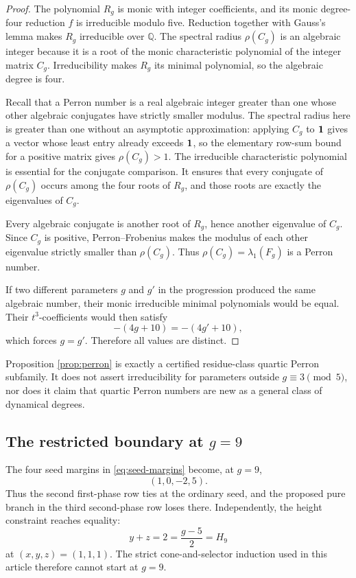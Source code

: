 \documentclass[11pt]{article}
\theoremstyle{remark}
\numberwithin{equation}{section}
\begin{document}
\begin{proof}
The polynomial \(R_g\) is monic with integer coefficients, and its monic
degree-four reduction \(f\) is irreducible modulo five.  Reduction together
with Gauss's lemma makes \(R_g\) irreducible over \(\mathbb Q\).
The spectral radius \(\rho(C_g)\) is an algebraic integer because it is a
root of the monic characteristic polynomial of the integer matrix \(C_g\).
Irreducibility makes \(R_g\) its minimal polynomial, so the algebraic degree
is four.

Recall that a Perron number is a real algebraic integer greater than one
whose other algebraic conjugates have strictly smaller modulus.  The
spectral radius here is greater than one without an asymptotic
approximation: applying \(C_g\) to \(\mathbf{1}\) gives a vector whose least entry
already exceeds \(\mathbf{1}\), so the elementary row-sum bound for a positive
matrix gives \(\rho(C_g)>1\).  The irreducible characteristic polynomial is
essential for the conjugate comparison.  It ensures that every conjugate
of \(\rho(C_g)\) occurs among the four roots of \(R_g\), and those roots are
exactly the eigenvalues of \(C_g\).

Every algebraic conjugate is another root of \(R_g\), hence another
eigenvalue of \(C_g\).  Since \(C_g\) is positive, Perron--Frobenius makes
the modulus of each other eigenvalue strictly smaller than
\(\rho(C_g)\).  Thus \(\rho(C_g)=\lambda_1(F_g)\) is a Perron number.

If two different parameters \(g\) and \(g'\) in the progression produced
the same algebraic number, their monic irreducible minimal polynomials would
be equal.  Their \(t^3\)-coefficients would then satisfy
\[
-(4g+10)=-(4g'+10),
\]
which forces \(g=g'\).  Therefore all values are distinct.
\end{proof}

Proposition \ref{prop:perron} is exactly a certified residue-class quartic
Perron subfamily.  It does not assert irreducibility for parameters outside
\(g\equiv3\pmod5\), nor does it claim that quartic Perron numbers are new as
a general class of dynamical degrees.

\subsection{The restricted boundary at \texorpdfstring{\(g=9\)}{g=9}}

The four seed margins in \eqref{eq:seed-margins} become, at \(g=9\),
\begin{equation}\label{eq:g9-margins}
(1,0,-2,5).
\end{equation}
Thus the second first-phase row ties at the ordinary seed, and the proposed
pure branch in the third second-phase row loses there.  Independently, the
height constraint reaches equality:
\[
y+z=2=\frac{g-5}{2}=H_9
\]
at \((x,y,z)=(1,1,1)\).  The strict cone-and-selector induction used in this
article therefore cannot start at \(g=9\).
\end{document}
